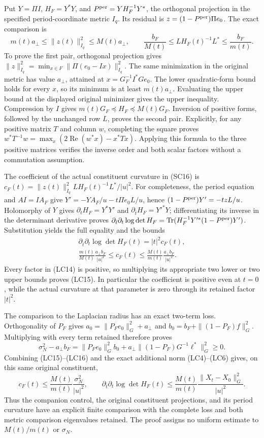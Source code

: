 Put $Y=\Pi I$, $H_F=Y^*Y$, and
$P^{\rm per}=YH_F^{-1}Y^*$, the orthogonal projection in the
specified period-coordinate metric $I_q$. Its residual is
$z=(1-P^{\rm per})\Pi e_0$. The exact comparison is
\[
 \boxed{m(t)a_\perp\le\|z(t)\|_{I_q}^2\le M(t)a_\perp,
 \qquad
 \frac{b_F}{M(t)}\le L H_F(t)^{-1}L^*
                         \le\frac{b_F}{m(t)}.}
 \tag{LC14}
\]
To prove the first pair, orthogonal projection gives
$\|z\|_{I_q}^2=\min_{x\in F}\|\Pi(e_0-Ix)\|_{I_q}^2$.
The same minimization in the original metric has value
$a_\perp$, attained at $x=G_F^{-1}I^*Ge_0$.
The lower quadratic-form bound holds for every $x$, so its minimum
is at least $m(t)a_\perp$. Evaluating the upper bound at the
displayed original minimizer gives the upper inequality.
Compression by $I$ gives $m(t)G_F\preceq H_F\preceq M(t)G_F$.
Inversion of positive forms, followed by the unchanged row $L$,
proves the second pair. Explicitly, for any positive matrix $T$
and column $w$, completing the square proves
$w^*T^{-1}w=\max_x(2\operatorname{Re}(w^*x)-x^*Tx)$.
Applying this formula to the three positive matrices verifies the
inverse order and both scalar factors without a commutation assumption.

The coefficient of the actual constituent curvature in (SC16) is
$c_F(t)=\|z(t)\|_{I_q}^2 L H_F(t)^{-1}L^*/|u|^2$.
For completeness, the period equation and $AI=IA_F$ give
$Y'=-YA_F/u-t\Pi e_0L/u$, hence
$(1-P^{\rm per})Y'=-tzL/u$.
Holomorphy of $Y$ gives $\partial_tH_F=Y^*Y'$ and
$\partial_{\bar t}H_F=Y'^*Y$; differentiating its inverse in
the determinant derivative proves
$\partial_{\bar t}\partial_t\log\det H_F
=\operatorname{Tr}(H_F^{-1}Y'^*(1-P^{\rm per})Y')$.
Substitution yields the full equality and the bounds
\[
\begin{gathered}
 \partial_{\bar t}\partial_t\log\det H_F(t)=|t|^2c_F(t),\\
 \boxed{\frac{m(t)}{M(t)}\frac{a_\perp b_F}{|u|^2}
       \le c_F(t)\le
       \frac{M(t)}{m(t)}\frac{a_\perp b_F}{|u|^2}.}
\end{gathered}\tag{LC15}
\]
Every factor in (LC14) is positive, so multiplying its appropriate
two lower or two upper bounds proves (LC15). In particular the
coefficient is positive even at $t=0$, while the actual curvature
at that parameter is zero through its retained factor $|t|^2$.

The comparison to the Laplacian radius has an exact two-term loss.
Orthogonality of $P_F$ gives
$a_0=\|P_Fe_0\|_G^2+a_\perp$ and
$b_0=b_F+\|(1-P_F)f\|_G^2$. Multiplying with every term
retained therefore proves
\[
 \boxed{\sigma_N^2-a_\perp b_F
  =\|P_Fe_0\|_G^2 b_0
      +a_\perp\|(1-P_F)G^{-1}\ell^*\|_G^2\ge0.}
 \tag{LC16}
\]
Combining (LC15)--(LC16) and the exact additional norm (LC4)--(LC6)
gives, on this same original constituent,
\[
 c_F(t)\le\frac{M(t)}{m(t)}\frac{\sigma_N^2}{|u|^2},\qquad
 \partial_{\bar t}\partial_t\log\det H_F(t)
 \le\frac{M(t)}{m(t)}
           \frac{\|X_t-X_0\|_G^2}{|u|^2}.
\]
Thus the companion control, the original constituent projections,
and its period curvature have an explicit finite comparison with
the complete loss and both metric comparison eigenvalues retained.
The proof assigns no uniform estimate to $M(t)/m(t)$ or $\sigma_N$.


\endgroup
